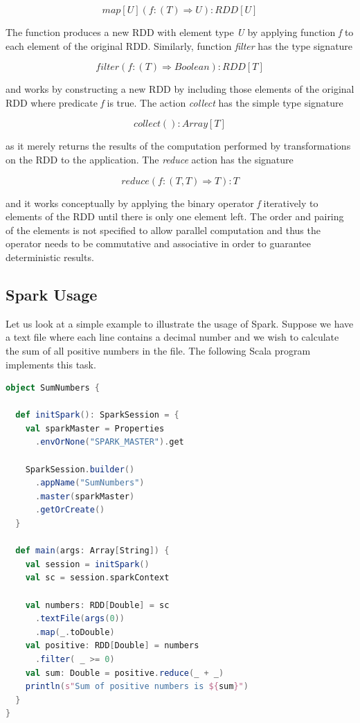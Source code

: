 \[map[U](f: (T) \Rightarrow U): RDD[U]\]

The function produces a new RDD with element type \textit{U} by applying function \textit{f} to each element of the original RDD. Similarly, function \textit{filter} has the type signature

\[filter(f: (T) \Rightarrow Boolean): RDD[T]\]

and works by constructing a new RDD by including those elements of the original RDD where predicate \textit{f} is true. The action \textit{collect} has the simple type signature 

\[collect(): Array[T]\]

as it merely returns the results of the computation performed by transformations on the RDD to the application. The \textit{reduce} action has the signature

\[reduce(f: (T, T) \Rightarrow T): T\]

and it works conceptually by applying the binary operator \textit{f} iteratively to elements of the RDD until there is only one element left. The order and pairing of the elements is not specified to allow parallel computation and thus the operator needs to be commutative and associative in order to guarantee deterministic results. 

\subsection{Spark Usage}

Let us look at a simple example to illustrate the usage of Spark. Suppose we have a text file where each line contains a decimal number and we wish to calculate the sum of all positive numbers in the file. The following Scala program implements this task.  

\begin{minipage}{0.95\linewidth}
\begin{lstlisting}[language=scala] 
object SumNumbers {

  def initSpark(): SparkSession = {
    val sparkMaster = Properties
      .envOrNone("SPARK_MASTER").get

    SparkSession.builder()
      .appName("SumNumbers")
      .master(sparkMaster)
      .getOrCreate()
  }

  def main(args: Array[String]) {
    val session = initSpark()
    val sc = session.sparkContext

    val numbers: RDD[Double] = sc
      .textFile(args(0))
      .map(_.toDouble)
    val positive: RDD[Double] = numbers
      .filter( _ >= 0)
    val sum: Double = positive.reduce(_ + _)
    println(s"Sum of positive numbers is ${sum}")
  }
}        
\end{lstlisting}
\end{minipage}

